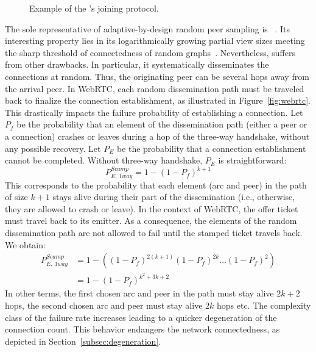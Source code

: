 \begin{figure*}
  \centering
  \hspace{8pt}
  \hspace{8pt}
  \caption{\label{fig:joiningexample}Example of the \SPRAY's joining
    protocol.}
\end{figure*}

The sole representative of adaptive-by-design random peer sampling is
\SCAMP~\cite{ganesh2001scamp,ganesh2003peer}. Its interesting property lies in
its logarithmically growing partial view sizes meeting the sharp threshold of
connectedness of random graphs~\cite{erdos1959random}. Nevertheless, \SCAMP
suffers from other drawbacks. In particular, it systematically disseminates the
connections at random. Thus, the originating peer can be several hops away
from the arrival peer. In WebRTC, each random dissemination path must be
traveled back to finalize the connection establishment, as illustrated in
Figure~\ref{fig:webrtc}. This drastically impacts the \SCAMP failure
probability of establishing a connection.  Let $P_f$ be the probability that an
element of the dissemination path (either a peer or a connection) crashes or
leaves during a hop of the three-way handshake, without any possible
recovery. Let $P_E$ be the probability that a connection establishment cannot
be completed. Without three-way handshake, $P_E$ is straightforward:
\begin{equation} P_{E,\,1way}^{Scamp}=1-(1- P_f)^{k+1} \end{equation} This
corresponds to the probability that each element (arc and peer) in the path of
size $k+1$ stays alive during their part of the dissemination (i.e., otherwise,
they are allowed to crash or leave). In the context of WebRTC, the offer ticket must
travel back to its emitter. As a consequence, the elements of the random
dissemination path are not allowed to fail until the stamped ticket travels
back. We obtain:
\begin{align} P_{E,\,3way}^{Scamp} &=1 - ((1-P_f)^{2(k+1)} (1-P_f)^{2k}
                                     \ldots (1-P_f)^2) \nonumber \\
                                   &=1-(1-P_f)^{k^2+3k+2}
\end{align}
In other terms, the first chosen arc and peer in the path must stay alive
$2k+2$ hops, the second chosen arc and peer must stay alive $2k$ hops etc.  The
complexity class of the \SCAMP failure rate increases leading to a quicker
degeneration of the connection count. This behavior endangers the network
connectedness, as depicted in Section~\ref{subsec:degeneration}.

